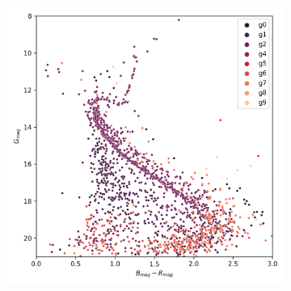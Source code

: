 \documentclass[11pt,a4paper,english,twocolumn]{article}
\begin{document}
\begin{figure}[!hbt]
\begin{subfigure}{0.3\textwidth}
  \end{subfigure}
  \begin{subfigure}{0.3\textwidth}
    \includegraphics[width=\textwidth]{../figures/ngc_2682/dec_hr_diagram_filtered_ngc_2682.png}
  \end{subfigure}


\end{figure}
\end{document}
